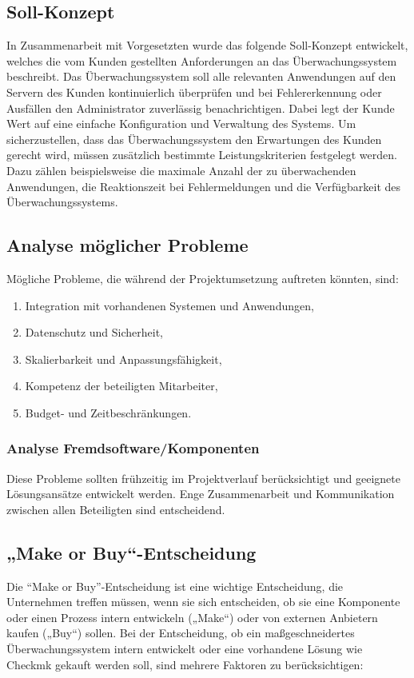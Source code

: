 \begin{flushleft}
	\subsection{Soll-Konzept}
	In Zusammenarbeit mit Vorgesetzten wurde das folgende Soll-Konzept entwickelt, welches die vom Kunden gestellten Anforderungen an das Überwachungssystem beschreibt.
	Das Überwachungssystem soll alle relevanten Anwendungen auf den Servern des Kunden kontinuierlich überprüfen und bei Fehlererkennung oder Ausfällen den Administrator zuverlässig benachrichtigen. Dabei legt der Kunde Wert auf eine einfache Konfiguration und Verwaltung des Systems.
	Um sicherzustellen, dass das Überwachungssystem den Erwartungen des Kunden gerecht wird, müssen zusätzlich bestimmte Leistungskriterien festgelegt werden. Dazu zählen beispielsweise die maximale Anzahl der zu überwachenden Anwendungen, die Reaktionszeit bei Fehlermeldungen und die Verfügbarkeit des Überwachungssystems.

	\subsection{Analyse möglicher Probleme}

	Mögliche Probleme, die während der Projektumsetzung auftreten könnten, sind:
	\begin{enumerate}
	\item Integration mit vorhandenen Systemen und Anwendungen,
	\item Datenschutz und Sicherheit,
	\item Skalierbarkeit und Anpassungsfähigkeit,
	\item Kompetenz der beteiligten Mitarbeiter,
	\item Budget- und Zeitbeschränkungen.
	\end{enumerate}
	\subsubsection{Analyse Fremdsoftware/Komponenten}
	Diese Probleme sollten frühzeitig im Projektverlauf berücksichtigt und geeignete Lösungsansätze entwickelt werden. Enge Zusammenarbeit und Kommunikation zwischen allen Beteiligten sind entscheidend.
	\subsection{„Make or Buy“-Entscheidung}

	Die “Make or Buy”-Entscheidung ist eine wichtige Entscheidung, die Unternehmen treffen müssen, wenn sie sich entscheiden, ob sie eine Komponente oder einen Prozess intern entwickeln („Make“) oder von externen Anbietern kaufen („Buy“) sollen. Bei der Entscheidung, ob ein maßgeschneidertes Überwachungssystem intern entwickelt oder eine vorhandene Lösung wie Checkmk gekauft werden soll, sind mehrere Faktoren zu berücksichtigen:


\end{flushleft}
